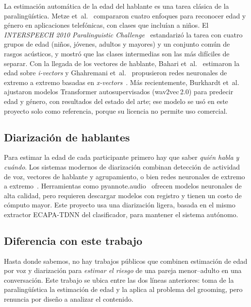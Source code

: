 \documentclass[11pt,a4paper]{article}
\begin{document}
La estimación automática de la edad del hablante es una tarea clásica de la paralingüística. Metze et~al.~\cite{metze2007} compararon cuatro enfoques para reconocer edad y género en aplicaciones telefónicas, con clases que incluían a niños. El \emph{INTERSPEECH 2010 Paralinguistic Challenge}~\cite{schuller2010} estandarizó la tarea con cuatro grupos de edad (niños, jóvenes, adultos y mayores) y un conjunto común de rasgos acústicos, y mostró que las clases intermedias son las más difíciles de separar. Con la llegada de los vectores de hablante, Bahari et~al.~\cite{bahari2014} estimaron la edad sobre \emph{i-vectors} y Ghahremani et~al.~\cite{ghahremani2018} propusieron redes neuronales de extremo a extremo basadas en \emph{x-vectors}~\cite{xvector2018}. Más recientemente, Burkhardt et~al.~\cite{burkhardt2023} ajustaron modelos Transformer autosupervisados (wav2vec\,2.0) para predecir edad y género, con resultados del estado del arte; ese modelo se usó en este proyecto solo como referencia, porque su licencia no permite uso comercial.

\subsection{Diarización de hablantes}

Para estimar la edad de cada participante primero hay que saber \emph{quién habla y cuándo}. Los sistemas modernos de diarización combinan detección de actividad de voz, vectores de hablante y agrupamiento, o bien redes neuronales de extremo a extremo~\cite{park2022}. Herramientas como pyannote.audio~\cite{pyannote2020} ofrecen modelos neuronales de alta calidad, pero requieren descargar modelos con registro y tienen un costo de cómputo mayor. Este proyecto usa una diarización ligera, basada en el mismo extractor ECAPA-TDNN del clasificador, para mantener el sistema autónomo.

\subsection{Diferencia con este trabajo}

Hasta donde sabemos, no hay trabajos públicos que combinen estimación de edad por voz y diarización para \emph{estimar el riesgo} de una pareja menor--adulto en una conversación. Este trabajo se ubica entre las dos líneas anteriores: toma de la paralingüística la estimación de edad y la aplica al problema del grooming, pero renuncia por diseño a analizar el contenido.
\end{document}
